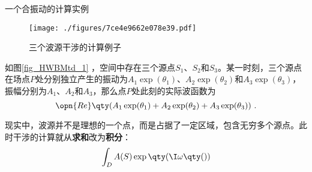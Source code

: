 \begin{example}{一个合振动的计算实例}

\begin{figure}[ht]
\centering
\texttt{[image: ./figures/7ce4e9662e078e39.pdf]}
\caption{三个波源干涉的计算例子} \label{fig_HWBMtd_1}
\end{figure}

如图\autoref{fig_HWBMtd_1} ，空间中存在三个源点$S_1$、$S_2$和$S_3$。某一时刻，三个源点在场点$P$处分别独立产生的振动为$A_1\exp(\theta_1)$、$A_2\exp(\theta_2)$和$A_3\exp(\theta_3)$，振幅分别为$A_1$、$A_2$和$A_3$，那么点$P$处此刻的实际波函数为
\begin{equation}
\opn{Re}\qty(A_1\exp(\theta_1)+A_2\exp(\theta_2)+A_3\exp(\theta_3))~. 
\end{equation}

\end{example}




现实中，波源并不是理想的一个点，而是占据了一定区域，包含无穷多个源点。此时干涉的计算就从\textbf{求和}改为\textbf{积分}：
\begin{equation}
\int_D A(S)\exp\qty(\I\omega\qty())
\end{equation}






















